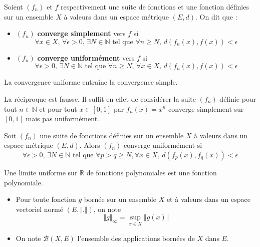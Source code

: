 
  \begin{definition}
    Soient $(f_n)$ et $f$ respectivement une suite de fonctions et une fonction définies sur un ensemble $X$ à valeurs dans un espace métrique $(E, d)$. On dit que :
    \begin{itemize}
      \item $(f_n)$ \textbf{converge simplement} vers $f$ si
      \[ \forall x \in X, \, \forall \epsilon > 0, \, \exists N \in \mathbb{N} \text{ tel que } \forall n \geq N, \, d(f_n(x), f(x)) < \epsilon \]
      \item $(f_n)$ \textbf{converge uniformément} vers $f$ si
      \[ \forall \epsilon > 0, \, \exists N \in \mathbb{N} \text{ tel que } \forall n \geq N, \, \forall x \in X, \, d(f_n(x), f(x)) < \epsilon \]
    \end{itemize}
  \end{definition}

  \begin{proposition}
    La convergence uniforme entraîne la convergence simple.
  \end{proposition}

  \begin{cexample}
    La réciproque est fausse. Il suffit en effet de considérer la suite $(f_n)$ définie pour tout $n \in \mathbb{N}$ et pour tout $x \in [0,1]$ par $f_n(x) = x^n$ converge simplement sur $[0,1]$ mais pas uniformément.
  \end{cexample}

  \begin{theorem}
    Soit $(f_n)$ une suite de fonctions définies sur un ensemble $X$ à valeurs dans un espace métrique $(E, d)$. Alors $(f_n)$ converge uniformément si
    \[ \forall \epsilon > 0, \, \exists N \in \mathbb{N} \text{ tel que } \forall p > q \geq N, \forall x \in X, \, d(f_p(x), f_q(x)) < \epsilon \]
  \end{theorem}


  \begin{corollary}
    Une limite uniforme sur $\mathbb{R}$ de fonctions polynomiales est une fonction polynomiale.
  \end{corollary}


  \begin{notation}
    \begin{itemize}
      \item Pour toute fonction $g$ bornée sur un ensemble $X$ et à valeurs dans un espace vectoriel normé $(E, \Vert . \Vert)$, on note
      \[ \Vert g \Vert_\infty = \sup_{x \in X} \Vert g(x) \Vert \]
      \item On note $\mathcal{B}(X,E)$ l'ensemble des applications bornées de $X$ dans $E$.
    \end{itemize}
  \end{notation}

